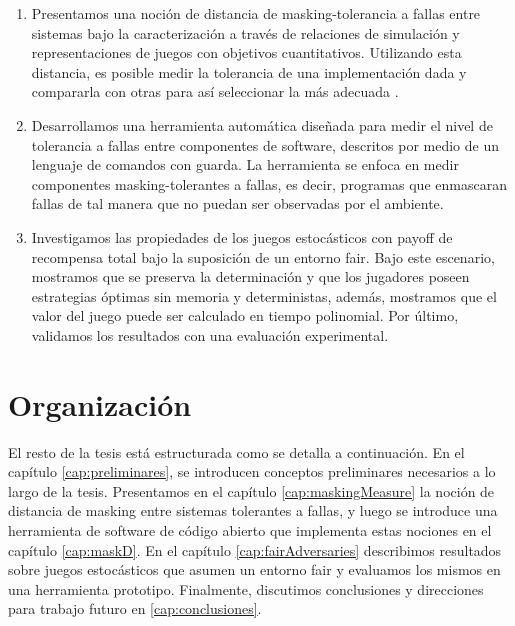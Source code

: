 \begin{enumerate}
	
\item Presentamos una noción de distancia de masking-tolerancia a fallas entre sistemas bajo la caracterización a través de relaciones de simulación y representaciones de juegos con objetivos cuantitativos. 
Utilizando esta distancia, es posible medir la tolerancia de una implementación dada y compararla con otras para así seleccionar la más adecuada \cite{CastroDDP18b}.
	
\item Desarrollamos una herramienta automática diseñada para medir el nivel de tolerancia a fallas entre componentes de software, descritos por medio de un lenguaje de comandos con guarda. La herramienta se enfoca en medir componentes masking-tolerantes a fallas, es decir, programas que enmascaran fallas de tal manera que no puedan ser observadas por el ambiente\cite{PutrueleDCD22}. 

\item Investigamos las propiedades de los juegos estocásticos con payoff de recompensa total bajo la suposición de un entorno fair. Bajo este escenario, mostramos que se preserva la determinación y que los jugadores poseen estrategias óptimas sin memoria y deterministas, además, mostramos que el valor del juego puede  ser calculado en tiempo polinomial. Por último, validamos los resultados con una evaluación experimental\cite{?}.  %
 
\end{enumerate}

\section{Organización}
\label{sec:intro.organizacion}
El resto de la tesis está estructurada como se detalla a continuación. 
En el capítulo \ref{cap:preliminares}, se introducen conceptos preliminares necesarios a lo largo de la tesis.
Presentamos en el capítulo \ref{cap:maskingMeasure} la noción de distancia de masking entre sistemas tolerantes a fallas, y luego se introduce una herramienta de software de código abierto que implementa estas nociones en el capítulo \ref{cap:maskD}.
En el capítulo \ref{cap:fairAdversaries} describimos resultados sobre juegos estocásticos que asumen un entorno fair y evaluamos los mismos en una herramienta prototipo.
Finalmente, discutimos conclusiones y direcciones para trabajo futuro en \ref{cap:conclusiones}.


